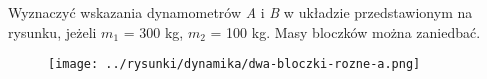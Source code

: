 Wyznaczyć wskazania dynamometrów \emph{A} i \emph{B} w układzie przedstawionym na rysunku, jeżeli \emph{$m_1$} = 300 kg, \emph{$m_2$} = 100 kg. Masy bloczków można zaniedbać.

\begin{figure}[H]
	\centering
	\texttt{[image: ../rysunki/dynamika/dwa-bloczki-rozne-a.png]}
\end{figure}

